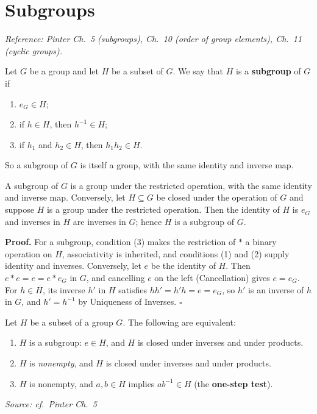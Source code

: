 \documentclass[11pt]{report}
\renewenvironment{proof}[1][Proof]{\noindent\textbf{#1.} }{\hfill$\square$\par\vspace{5pt}}
\newcommand{\srcline}[1]{\par\hfill{\footnotesize\textit{Source: #1}}}
\begin{document}
\section{Subgroups}\label{sec:subgroups}

\textit{Reference: Pinter Ch.\ 5 (subgroups), Ch.\ 10 (order of group elements), Ch.\ 11 (cyclic groups).}

\begin{defbox}[Subgroup]\label{def:subgroup}
Let $G$ be a group and let $H$ be a subset of $G$. We say that $H$ is a \textbf{subgroup} of $G$ if
\begin{enumerate}
    \item $e_G \in H$;
    \item if $h \in H$, then $h^{-1} \in H$;
    \item if $h_1$ and $h_2 \in H$, then $h_1 h_2 \in H$.
\end{enumerate}
So a subgroup of $G$ is itself a group, with the same identity and inverse map.
\end{defbox}

\begin{propbox}\label{prop:subset-group-subgroup}
A subgroup of $G$ is a group under the restricted operation, with the same identity and inverse map. Conversely, let $H \subseteq G$ be closed under the operation of $G$ and suppose $H$ is a group under the restricted operation. Then the identity of $H$ is $e_G$ and inverses in $H$ are inverses in $G$; hence $H$ is a subgroup of $G$.
\end{propbox}

\begin{proof}
For a subgroup, condition (3) makes the restriction of $*$ a binary operation on $H$, associativity is inherited, and conditions (1) and (2) supply identity and inverses. Conversely, let $e$ be the identity of $H$. Then $e * e = e = e * e_G$ in $G$, and cancelling $e$ on the left (Cancellation) gives $e = e_G$. For $h \in H$, its inverse $h'$ in $H$ satisfies $hh' = h'h = e = e_G$, so $h'$ is an inverse of $h$ in $G$, and $h' = h^{-1}$ by Uniqueness of Inverses.
\end{proof}

\begin{propbox}\label{prop:equivalent-subgroup-criteria}
Let $H$ be a subset of a group $G$. The following are equivalent:
\begin{enumerate}
    \item $H$ is a subgroup: $e \in H$, and $H$ is closed under inverses and under products.
    \item $H$ is \emph{nonempty}, and $H$ is closed under inverses and under products.
    \item $H$ is nonempty, and $a, b \in H$ implies $a b^{-1} \in H$ (the \textbf{one-step test}).
\end{enumerate}
\srcline{cf.\ Pinter Ch.\ 5}
\end{propbox}
\end{document}
